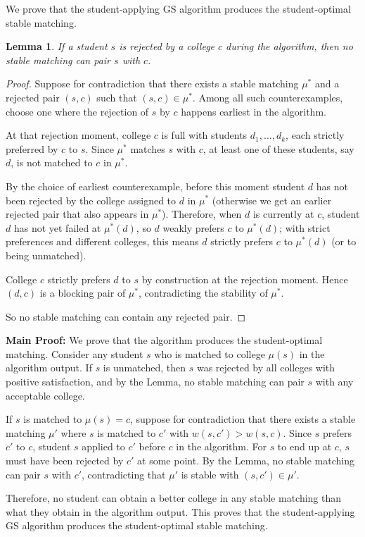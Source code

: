 \documentclass[a4paper, UTF-8]{article}
\theoremstyle{plain}
\newtheorem{lemma}[theorem]{\indent Lemma}
\begin{document}
We prove that the student-applying GS algorithm produces the student-optimal stable matching.

\begin{lemma}
    If a student $s$ is rejected by a college $c$ during the algorithm, then no stable matching can pair $s$ with $c$.
\end{lemma}

\begin{proof}
    Suppose for contradiction that there exists a stable matching $\mu^*$ and a rejected pair $(s,c)$ such that $(s,c) \in \mu^*$. Among all such counterexamples, choose one where the rejection of $s$ by $c$ happens earliest in the algorithm.

    At that rejection moment, college $c$ is full with students $d_1,\ldots,d_k$, each strictly preferred by $c$ to $s$. Since $\mu^*$ matches $s$ with $c$, at least one of these students, say $d$, is not matched to $c$ in $\mu^*$.

    By the choice of earliest counterexample, before this moment student $d$ has not been rejected by the college assigned to $d$ in $\mu^*$ (otherwise we get an earlier rejected pair that also appears in $\mu^*$). Therefore, when $d$ is currently at $c$, student $d$ has not yet failed at $\mu^*(d)$, so $d$ weakly prefers $c$ to $\mu^*(d)$; with strict preferences and different colleges, this means $d$ strictly prefers $c$ to $\mu^*(d)$ (or to being unmatched).

    College $c$ strictly prefers $d$ to $s$ by construction at the rejection moment. Hence $(d,c)$ is a blocking pair of $\mu^*$, contradicting the stability of $\mu^*$.

    So no stable matching can contain any rejected pair.
\end{proof}

\textbf{Main Proof:} We prove that the algorithm produces the student-optimal matching. Consider any student $s$ who is matched to college $\mu(s)$ in the algorithm output. If $s$ is unmatched, then $s$ was rejected by all colleges with positive satisfaction, and by the Lemma, no stable matching can pair $s$ with any acceptable college.

If $s$ is matched to $\mu(s) = c$, suppose for contradiction that there exists a stable matching $\mu'$ where $s$ is matched to $c'$ with $w(s, c') > w(s, c)$. Since $s$ prefers $c'$ to $c$, student $s$ applied to $c'$ before $c$ in the algorithm. For $s$ to end up at $c$, $s$ must have been rejected by $c'$ at some point. By the Lemma, no stable matching can pair $s$ with $c'$, contradicting that $\mu'$ is stable with $(s, c') \in \mu'$.

Therefore, no student can obtain a better college in any stable matching than what they obtain in the algorithm output. This proves that the student-applying GS algorithm produces the student-optimal stable matching. 
\end{document}
